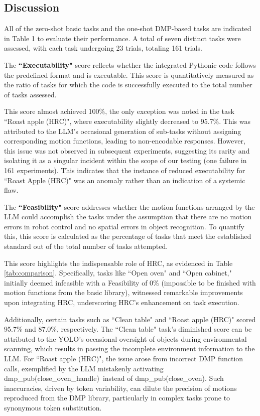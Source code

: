 \documentclass[letterpaper,conference]{ieeeconf}
\begin{document}
\subsection{Discussion}
All of the zero-shot basic tasks and the one-shot DMP-based tasks are indicated in Table 1 to evaluate their performance. A total of seven distinct tasks were assessed, with each task undergoing 23 trials, totaling 161 trials.

The \textbf{``Executability" }score reflects whether the integrated Pythonic code follows the predefined format and is executable. This score is quantitatively measured as the ratio of tasks for which the code is successfully executed to the total number of tasks assessed.

This score almost achieved 100\%, the only exception was noted in the task ``Roast apple (HRC)", where executability slightly decreased to 95.7\%. This was attributed to the LLM's occasional generation of sub-tasks without assigning corresponding motion functions, leading to non-encodable responses. 
However, this issue was not observed in subsequent experiments, suggesting its rarity and isolating it as a singular incident within the scope of our testing (one failure in 161 experiments). This indicates that the instance of reduced executability for ``Roast Apple (HRC)" was an anomaly rather than an indication of a systemic flaw.

The \textbf{``Feasibility"} score addresses whether the motion functions arranged by the LLM could accomplish the tasks under the assumption that there are no motion errors in robot control and no spatial errors in object recognition. To quantify this, this score is calculated as the percentage of tasks that meet the established standard out of the total number of tasks attempted.

This score highlights the indispensable role of HRC, as evidenced in Table \ref{tab:comparison}. Specifically, tasks like ``Open oven" and ``Open cabinet," initially deemed infeasible with a Feasibility of 0\% (impossible to be finished with motion functions from the basic library), witnessed remarkable improvements upon integrating HRC, underscoring HRC's enhancement on task execution.

Additionally, certain tasks such as ``Clean table" and ``Roast apple (HRC)" scored 95.7\% and 87.0\%, respectively. The ``Clean table" task's diminished score can be attributed to the YOLO's occasional oversight of objects during environmental scanning, which results in passing the incomplete environment information to the LLM. For ``Roast apple (HRC)", the issue arose from incorrect DMP function calls, exemplified by the LLM mistakenly activating \textquotesingle dmp\_pub(close\_oven\_handle)\textquotesingle\ instead of \textquotesingle dmp\_pub(close\_oven)\textquotesingle. Such inaccuracies, driven by token variability, can dilute the precision of motions reproduced from the DMP library, particularly in complex tasks prone to synonymous token substitution.
\end{document}
